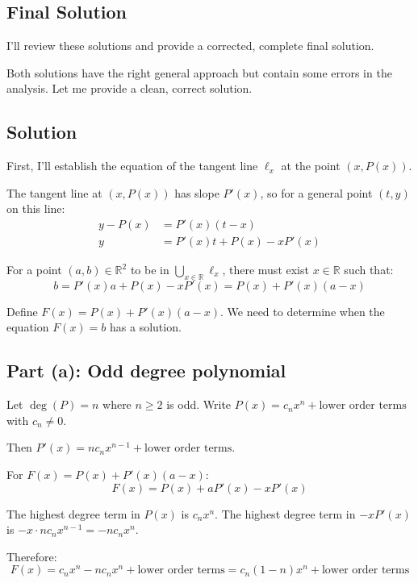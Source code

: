 \documentclass[12pt,a4paper]{article}
\theoremstyle{definition}
\begin{document}
\subsection{Final Solution}
        I'll review these solutions and provide a corrected, complete final solution.

        Both solutions have the right general approach but contain some errors in the analysis. Let me provide a clean, correct solution.

        \subsection*{Solution}

        First, I'll establish the equation of the tangent line $\ell_x$ at the point $(x, P(x))$.

        The tangent line at $(x, P(x))$ has slope $P'(x)$, so for a general point $(t, y)$ on this line:
        \begin{align}
            y - P(x) &= P'(x)(t - x) \\
            y &= P'(x)t + P(x) - xP'(x)
        \end{align}

        For a point $(a, b) \in \mathbb{R}^2$ to be in $\bigcup_{x \in \mathbb{R}} \ell_x$, there must exist $x \in \mathbb{R}$ such that:
        $$b = P'(x)a + P(x) - xP'(x) = P(x) + P'(x)(a - x)$$

        Define $F(x) = P(x) + P'(x)(a - x)$. We need to determine when the equation $F(x) = b$ has a solution.

        \subsection*{Part (a): Odd degree polynomial}

        Let $\deg(P) = n$ where $n \geq 2$ is odd. Write $P(x) = c_nx^n + \text{lower order terms}$ with $c_n \neq 0$.

        Then $P'(x) = nc_nx^{n-1} + \text{lower order terms}$.

        For $F(x) = P(x) + P'(x)(a - x)$:
        $$F(x) = P(x) + aP'(x) - xP'(x)$$

        The highest degree term in $P(x)$ is $c_nx^n$.
        The highest degree term in $-xP'(x)$ is $-x \cdot nc_nx^{n-1} = -nc_nx^n$.

        Therefore:
        $$F(x) = c_nx^n - nc_nx^n + \text{lower order terms} = c_n(1-n)x^n + \text{lower order terms}$$
\end{document}
